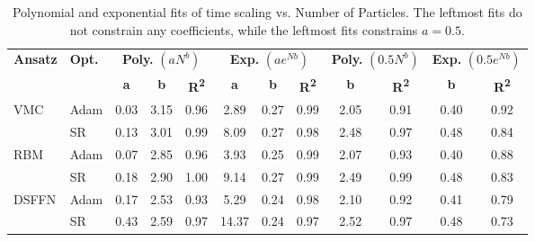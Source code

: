 \begin{table}[H]
    \centering
    \caption{Polynomial and exponential fits of time scaling vs. Number of Particles. The leftmost fits do not constrain any coefficients, while the leftmost fits constrains $a = 0.5$.}
    \begin{tabular}{llcccccc|cccc}
        \toprule
        \label{tab:time_fits}
        \textbf{Ansatz} & \textbf{Opt.} & \multicolumn{3}{c}{\textbf{Poly.} $(aN^b)$} & \multicolumn{3}{c}{\textbf{Exp.} $(ae^ {Nb})$} & \multicolumn{2}{c}{\textbf{Poly.} $(0.5N^b)$} & \multicolumn{2}{c}{\textbf{Exp.} $(0.5e^ {Nb})$} \\
        \cmidrule(lr){3-5} \cmidrule(lr){6-8} \cmidrule(lr){9-10} \cmidrule(lr){11-12}
        & & \textbf{a} & \textbf{b} & \textbf{R\textsuperscript{2}} & \textbf{a} & \textbf{b} & \textbf{R\textsuperscript{2}} & \textbf{b} & \textbf{R\textsuperscript{2}} & \textbf{b} & \textbf{R\textsuperscript{2}} \\
        \midrule
        \multirow{2}{*}{VMC} & Adam & 0.03 & 3.15 & 0.96 & 2.89 & 0.27 & 0.99 & 2.05 & 0.91 & 0.40 & 0.92 \\
         & SR & 0.13 & 3.01 & 0.99 & 8.09 & 0.27 & 0.98 & 2.48 & 0.97 & 0.48 & 0.84 \\
        \midrule
        \multirow{2}{*}{RBM} & Adam & 0.07 & 2.85 & 0.96 & 3.93& 0.25 & 0.99 & 2.07 & 0.93 & 0.40 & 0.88 \\
         & SR & 0.18 & 2.90 & 1.00 & 9.14 & 0.27 & 0.99 & 2.49 & 0.99 & 0.48 & 0.83 \\
        \midrule
        \multirow{2}{*}{DSFFN} & Adam & 0.17 & 2.53 & 0.93 & 5.29 & 0.24 & 0.98 & 2.10 & 0.92 & 0.41 & 0.79 \\
         & SR & 0.43 & 2.59 & 0.97 & 14.37 & 0.24 & 0.97 & 2.52 & 0.97 & 0.48 & 0.73 \\
        \bottomrule
    \end{tabular}
\end{table}
